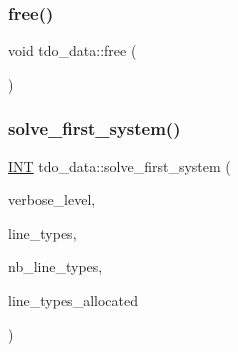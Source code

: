 \mbox{\label{classtdo__data_a351c38cc004470120f278d4ba938e98f}} 
\subsubsection{\texorpdfstring{free()}{free()}}
{\footnotesize\ttfamily void tdo\+\_\+data\+::free (\begin{DoxyParamCaption}{ }\end{DoxyParamCaption})}

\mbox{\label{classtdo__data_aa62a57bd301396164352018141e4966e}} 
\subsubsection{\texorpdfstring{solve\+\_\+first\+\_\+system()}{solve\_first\_system()}}
{\footnotesize\ttfamily \mbox{\hyperlink{galois_8h_a09fddde158a3a20bd2dcadb609de11dc}{I\+NT}} tdo\+\_\+data\+::solve\+\_\+first\+\_\+system (\begin{DoxyParamCaption}\item[{\mbox{\hyperlink{galois_8h_a09fddde158a3a20bd2dcadb609de11dc}{I\+NT}}}]{verbose\+\_\+level,  }\item[{\mbox{\hyperlink{galois_8h_a09fddde158a3a20bd2dcadb609de11dc}{I\+NT}} $\ast$\&}]{line\+\_\+types,  }\item[{\mbox{\hyperlink{galois_8h_a09fddde158a3a20bd2dcadb609de11dc}{I\+NT}} \&}]{nb\+\_\+line\+\_\+types,  }\item[{\mbox{\hyperlink{galois_8h_a09fddde158a3a20bd2dcadb609de11dc}{I\+NT}} \&}]{line\+\_\+types\+\_\+allocated }\end{DoxyParamCaption})}

\mbox{\label{classtdo__data_af722419adafb1c21a5f2a5b9fbadb0e3}} 
